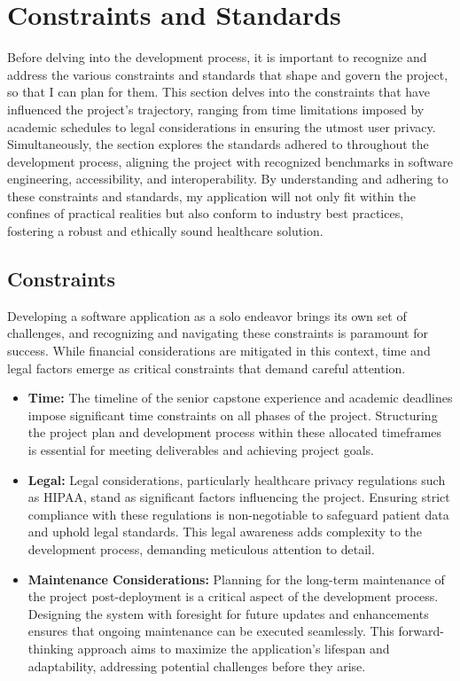 \chapter{Constraints and Standards}

Before delving into the development process, it is important to recognize and address the various constraints and standards that shape and govern the project, so that I can plan for them. This section delves into the constraints that have influenced the project's trajectory, ranging from time limitations imposed by academic schedules to legal considerations in ensuring the utmost user privacy. Simultaneously, the section explores the standards adhered to throughout the development process, aligning the project with recognized benchmarks in software engineering, accessibility, and interoperability. By understanding and adhering to these constraints and standards, my application will not only fit within the confines of practical realities but also conform to industry best practices, fostering a robust and ethically sound healthcare solution.

\section{Constraints}

Developing a software application as a solo endeavor brings its own set of challenges, and recognizing and navigating these constraints is paramount for success. While financial considerations are mitigated in this context, time and legal factors emerge as critical constraints that demand careful attention.

\begin{itemize}
    \item \textbf{Time:} The timeline of the senior capstone experience and academic deadlines impose significant time constraints on all phases of the project. Structuring the project plan and development process within these allocated timeframes is essential for meeting deliverables and achieving project goals.
    \item \textbf{Legal:} Legal considerations, particularly healthcare privacy regulations such as HIPAA, stand as significant factors influencing the project. Ensuring strict compliance with these regulations is non-negotiable to safeguard patient data and uphold legal standards. This legal awareness adds complexity to the development process, demanding meticulous attention to detail.
    \item \textbf{Maintenance Considerations:} Planning for the long-term maintenance of the project post-deployment is a critical aspect of the development process. Designing the system with foresight for future updates and enhancements ensures that ongoing maintenance can be executed seamlessly. This forward-thinking approach aims to maximize the application's lifespan and adaptability, addressing potential challenges before they arise.
\end{itemize}

